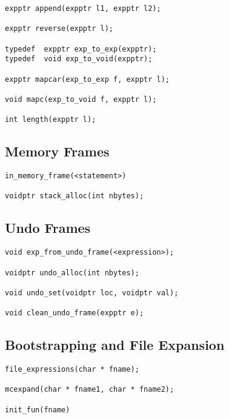 \documentclass{article}
\begin{document}
\begin{verbatim}
expptr append(expptr l1, expptr l2);

expptr reverse(expptr l);

typedef  expptr exp_to_exp(expptr);
typedef  void exp_to_void(expptr);

expptr mapcar(exp_to_exp f, expptr l);

void mapc(exp_to_void f, expptr l);

int length(expptr l);
\end{verbatim}

\subsection{Memory Frames}

\begin{verbatim}
in_memory_frame(<statement>)

voidptr stack_alloc(int nbytes);
\end{verbatim}

\subsection{Undo Frames}

\begin{verbatim}
void exp_from_undo_frame(<expression>);

voidptr undo_alloc(int nbytes);

void undo_set(voidptr loc, voidptr val);

void clean_undo_frame(expptr e);
\end{verbatim}

\subsection{Bootstrapping and File Expansion}

\begin{verbatim}
file_expressions(char * fname);

mcexpand(char * fname1, char * fname2);

init_fun(fname)
\end{verbatim}




\end{document}

